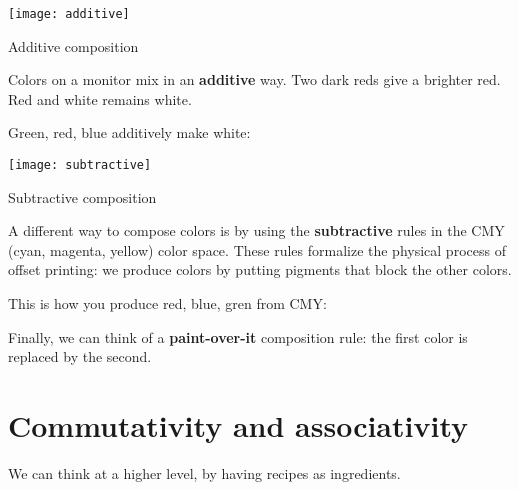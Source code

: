 \begin{center}
\end{center}

\begin{marginfigure}
  \texttt{[image: additive]}
  \caption{Additive composition}
\end{marginfigure}

Colors on a monitor mix in an \textbf{additive} way. Two dark reds give a brighter red.
Red and white remains white.

\begin{center}
\end{center}

Green, red, blue additively make white:


\begin{marginfigure}
  \texttt{[image: subtractive]}
  \caption{Subtractive composition}
\end{marginfigure}

A different way to compose colors is by using the \textbf{subtractive} rules in the CMY (cyan, magenta, yellow) color space.
These rules formalize the physical process of offset printing: we produce colors by putting pigments that block the other colors.


\begin{center}
\end{center}

This is how you produce red, blue, gren from CMY:


\begin{center}
  \end{center}

Finally, we can think of a \textbf{paint-over-it} composition rule: the first color is replaced by the second.

\begin{center}
\end{center}



\section{Commutativity and associativity}

We can think at a higher level, by having recipes as ingredients.

